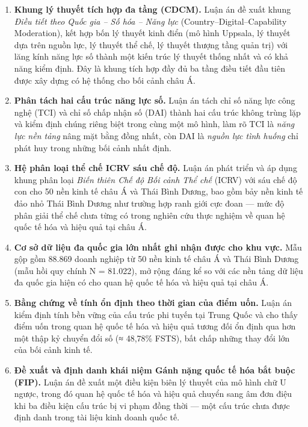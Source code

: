 \documentclass[
  a4paper,
  13pt]{extarticle}
\begin{document}
\begin{enumerate}
\def\labelenumi{\arabic{enumi}.}
\item
  \textbf{Khung lý thuyết tích hợp đa tầng (CDCM).} Luận án đề xuất
  khung \emph{Điều tiết theo Quốc gia -- Số hóa -- Năng lực}
  (Country--Digital--Capability Moderation), kết hợp bốn lý thuyết kinh
  điển (mô hình Uppsala, lý thuyết dựa trên nguồn lực, lý thuyết thể
  chế, lý thuyết thượng tầng quản trị) với lăng kính năng lực số thành
  một kiến trúc lý thuyết thống nhất và có khả năng kiểm định. Đây là
  khung tích hợp đầy đủ ba tầng điều tiết đầu tiên được xây dựng có hệ
  thống cho bối cảnh châu Á.
\item
  \textbf{Phân tách hai cấu trúc năng lực số.} Luận án tách chỉ số năng
  lực công nghệ (TCI) và chỉ số chấp nhận số (DAI) thành hai cấu trúc
  không trùng lặp và kiểm định chúng riêng biệt trong cùng một mô hình,
  làm rõ TCI là \emph{năng lực nền tảng} nâng mặt bằng đồng nhất, còn
  DAI là \emph{nguồn lực tình huống} chỉ phát huy trong những bối cảnh
  nhất định.
\item
  \textbf{Hệ phân loại thể chế ICRV sáu chế độ.} Luận án phát triển và
  áp dụng khung phân loại \emph{Biến thiên Chế độ Bối cảnh Thể chế}
  (ICRV) với sáu chế độ con cho 50 nền kinh tế châu Á và Thái Bình
  Dương, bao gồm bảy nền kinh tế đảo nhỏ Thái Bình Dương như trường hợp
  ranh giới cực đoan --- mức độ phân giải thể chế chưa từng có trong
  nghiên cứu thực nghiệm về quan hệ quốc tế hóa và hiệu quả tại châu Á.
\item
  \textbf{Cơ sở dữ liệu đa quốc gia lớn nhất ghi nhận được cho khu vực.}
  Mẫu gộp gồm 88.869 doanh nghiệp từ 50 nền kinh tế châu Á và Thái Bình
  Dương (mẫu hồi quy chính N = 81.022), mở rộng đáng kể so với các nền
  tảng dữ liệu đa quốc gia hiện có cho quan hệ quốc tế hóa và hiệu quả
  tại châu Á.
\item
  \textbf{Bằng chứng về tính ổn định theo thời gian của điểm uốn.} Luận
  án kiểm định tính bền vững của cấu trúc phi tuyến tại Trung Quốc và
  cho thấy điểm uốn trong quan hệ quốc tế hóa và hiệu quả tương đối ổn
  định qua hơn một thập kỷ chuyển đổi số (≈ 48,78\% FSTS), bất chấp
  những thay đổi lớn của bối cảnh kinh tế.
\item
  \textbf{Đề xuất và định danh khái niệm Gánh nặng quốc tế hóa bắt buộc
  (FIP).} Luận án đề xuất một điều kiện biên lý thuyết của mô hình chữ U
  ngược, trong đó quan hệ quốc tế hóa và hiệu quả chuyển sang âm đơn
  điệu khi ba điều kiện cấu trúc bị vi phạm đồng thời --- một cấu trúc
  chưa được định danh trong tài liệu kinh doanh quốc tế.
\end{enumerate}
\end{document}
